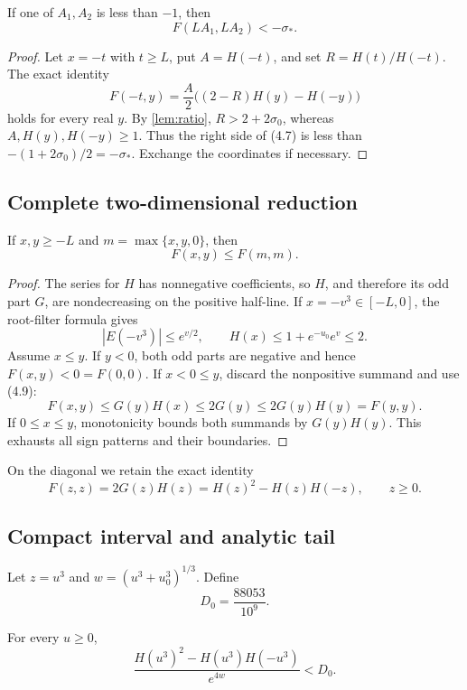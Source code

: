 \begin{lemma}[Separator]\label{lem:separator}
If one of \(A_1,A_2\) is less than \(-1\), then
\[
 F(LA_1,LA_2)<-\sigma_*.
 \tag{4.6}
\]
\end{lemma}

\begin{proof}
Let \(x=-t\) with \(t\ge L\), put \(A=H(-t)\), and set
\(R=H(t)/H(-t)\).  The exact identity
\[
 F(-t,y)=\frac A2\bigl((2-R)H(y)-H(-y)\bigr)
 \tag{4.7}
\]
holds for every real \(y\).  By \cref{lem:ratio}, \(R>2+2\sigma_0\),
whereas \(A,H(y),H(-y)\ge1\).  Thus the right side of (4.7) is less than
\(-(1+2\sigma_0)/2=-\sigma_*\).  Exchange the coordinates if necessary.
\end{proof}

\subsection{Complete two-dimensional reduction}

\begin{lemma}\label{lem:diagonal-reduction}
If \(x,y\ge-L\) and \(m=\max\{x,y,0\}\), then
\[
 F(x,y)\le F(m,m).
 \tag{4.8}
\]
\end{lemma}

\begin{proof}
The series for \(H\) has nonnegative coefficients, so \(H\), and therefore
its odd part \(G\), are nondecreasing on the positive half-line.  If
\(x=-v^3\in[-L,0]\), the root-filter formula gives
\[
 |E(-v^3)|\le e^{v/2},\qquad
 H(x)\le1+e^{-u_0}e^v\le2.
 \tag{4.9}
\]
Assume \(x\le y\).  If \(y<0\), both odd parts are negative and hence
\(F(x,y)<0=F(0,0)\).  If \(x<0\le y\), discard the nonpositive summand and
use (4.9):
\[
 F(x,y)\le G(y)H(x)\le2G(y)\le2G(y)H(y)=F(y,y).
\]
If \(0\le x\le y\), monotonicity bounds both summands by \(G(y)H(y)\).
This exhausts all sign patterns and their boundaries.
\end{proof}

On the diagonal we retain the exact identity
\[
 F(z,z)=2G(z)H(z)=H(z)^2-H(z)H(-z),\qquad z\ge0.
 \tag{4.10}
\]

\subsection{Compact interval and analytic tail}

Let \(z=u^3\) and \(w=(u^3+u_0^3)^{1/3}\).  Define
\[
 D_0=\frac{88053}{10^9}.
\]

\begin{lemma}\label{lem:envelope}
For every \(u\ge0\),
\[
 \frac{H(u^3)^2-H(u^3)H(-u^3)}{e^{4w}}<D_0.
 \tag{4.11}
\]
\end{lemma}

